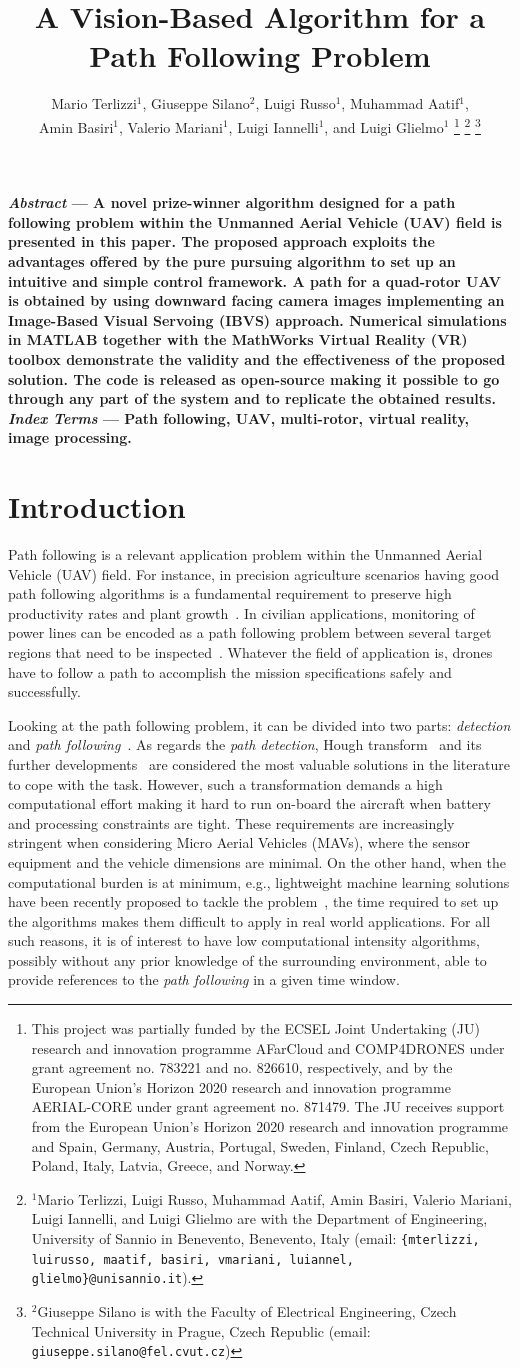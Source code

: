 \documentclass[a4paper,twocolumn,10pt]{article}
\title{\textbf{A Vision-Based Algorithm for a Path Following Problem}}
\author{Mario Terlizzi$^{1}$, Giuseppe Silano$^{2}$, Luigi Russo$^{1}$, Muhammad Aatif$^{1}$,\\
Amin Basiri$^{1}$, Valerio Mariani$^{1}$, Luigi Iannelli$^{1}$, and Luigi Glielmo$^{1}$
    \thanks{This project was partially funded by the ECSEL Joint Undertaking (JU) research and innovation programme AFarCloud and COMP4DRONES under grant agreement no. 783221 and no. 826610, respectively, and by the European Union's Horizon 2020 research and innovation programme AERIAL-CORE under grant agreement no. 871479. The JU receives support from the European Union's Horizon 2020 research and innovation programme and Spain, Germany, Austria, Portugal, Sweden, Finland, Czech Republic, Poland, Italy, Latvia, Greece, and Norway.}
    \thanks{$^{1}$Mario Terlizzi, Luigi Russo, Muhammad Aatif, Amin Basiri, Valerio Mariani, Luigi Iannelli, and Luigi Glielmo are with the Department of Engineering, University of Sannio in Benevento, Benevento, Italy (email:  {\tt\small \{mterlizzi, luirusso, maatif, basiri, vmariani, luiannel, glielmo\}@unisannio.it}).}
    \thanks{$^{2}$Giuseppe Silano is with the Faculty of Electrical Engineering, Czech Technical University in Prague, Czech Republic (email: {\tt\small giuseppe.silano@fel.cvut.cz})}
}
\date{}
\begin{document}
\maketitle

    {\fontsize{9}{12}
    \textbf{\textit{Abstract} — A novel prize-winner algorithm designed for a path following problem within the Unmanned Aerial Vehicle (UAV) field is presented in this paper. The proposed approach exploits the advantages offered by the pure pursuing algorithm to set up an intuitive and simple control framework. A path for a quad-rotor UAV is obtained by using downward facing camera images implementing an Image-Based Visual Servoing (IBVS) approach. Numerical simulations in MATLAB{\textregistered} together with the MathWorks{\texttrademark} Virtual Reality (VR) toolbox demonstrate the validity and the effectiveness of the proposed solution. The code is released as open-source making it possible to go through any part of the system and to replicate the obtained results.\\
    \textit{Index Terms} — Path following, UAV, multi-rotor, virtual reality, image processing.}}

    \section{Introduction}

    Path following is a relevant application problem within the Unmanned Aerial Vehicle (UAV) field. For instance, in precision agriculture scenarios having good path following algorithms is a fundamental requirement 
    to preserve high productivity rates and plant growth~\cite{bibItem1}. In civilian applications, monitoring of power lines can be encoded as a path following problem between several target regions that need to be inspected~\cite{bibItem2}. Whatever the field of application is, drones have to follow a path to accomplish the mission specifications safely and successfully. 

    Looking at the path following problem, it can be divided into two parts: 
    \textit{detection} and \textit{path following}~\cite{bibItem3, bibItem4}. 
    As regards the \textit{path detection}, Hough transform~\cite{bibItem5} and its further 
    developments~\cite{bibItem6, bibItem7} are considered the most valuable solutions in the literature to cope with the task. However, such a transformation demands a high computational effort making it hard to run on-board the aircraft when battery and processing constraints are tight. These requirements are increasingly stringent when considering  Micro Aerial Vehicles (MAVs), where the sensor equipment and the vehicle dimensions are minimal. On the other hand, when the computational burden is at minimum, e.g., lightweight machine learning solutions have been recently proposed to tackle 
    the problem~\cite{bibItem8, bibItem9}, the time required to set up the algorithms makes them difficult to apply in real world applications. For all such reasons, it is of interest to have low computational intensity algorithms, possibly without any prior knowledge of the surrounding environment, able to provide references to the \textit{path following} in a given time window.
\end{document}
